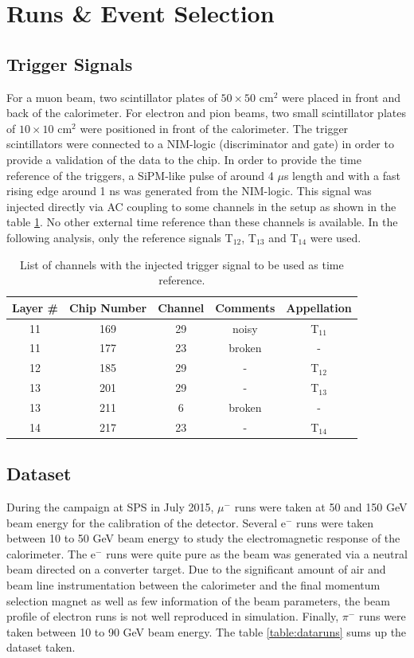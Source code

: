 \section{Runs \& Event Selection}

\subsection{Trigger Signals}
\label{subsec:trigger}

For a muon beam, two scintillator plates of $50\times50$ cm$^2$ were placed in front and back of the calorimeter. For electron and pion beams, two small scintillator plates of $10\times10$ cm$^2$ were positioned in front of the calorimeter. The trigger scintillators were connected to a NIM-logic (discriminator and gate) in order to provide a validation of the data to the chip.
In order to provide the time reference of the triggers, a SiPM-like pulse of around 4 $\mu$s length and with a fast rising edge around 1 ns was generated from the NIM-logic. This signal was injected directly via AC coupling to some channels in the setup as shown in the table \ref{table:trigger_signal_list}. No other external time reference than these channels is available. In the following analysis, only the reference signals T$_{12}$,  T$_{13}$ and T$_{14}$ were used.

\begin{table}[t]
	\centering
	\caption{List of channels with the injected trigger signal to be used as time reference.}
	\label{table:trigger_signal_list}
	\begin{tabular}{@{} ccccc @{}}
		\hline
		Layer \# & Chip Number & Channel & Comments & Appellation \\
		\hline
		11 & 169 & 29 & noisy & T$_{11}$ \\
		11 & 177 & 23 & broken & - \\
		12 & 185 & 29 & - & T$_{12}$ \\
		13 & 201 & 29 & -  & T$_{13}$ \\
		13 & 211 & 6 & broken & - \\
		14 & 217 & 23 & - & T$_{14}$ \\
		\hline
	\end{tabular}
\end{table}

\subsection{Dataset}
\label{subsec:dataset}
During the campaign at SPS in July 2015, $\mu^-$ runs were taken at 50 and 150 GeV beam energy for the calibration of the detector. Several e$^{-}$ runs were taken between 10 to 50 GeV beam energy to study the electromagnetic response of the calorimeter. The e$^{-}$ runs were quite pure as the beam was generated via a neutral beam directed on a converter target. Due to the significant amount of air and beam line instrumentation between the calorimeter and the final momentum selection magnet as well as few information of the beam parameters, the beam profile of electron runs is not well reproduced in simulation. Finally, $\pi^-$ runs were taken between 10 to 90 GeV beam energy. The table \ref{table:dataruns} sums up the dataset taken.

